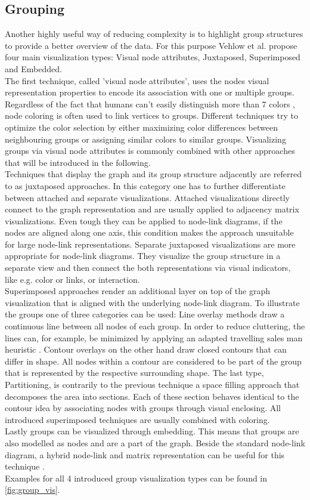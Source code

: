 \subsection{Grouping}
Another highly useful way of reducing complexity is to highlight group structures to provide a better overview of the data. For this purpose Vehlow et al.\cite{Vehlow2015} propose four main visualization types: Visual node attributes, Juxtaposed, Superimposed and Embedded.\\
The first technique, called 'visual node attributes', uses the nodes visual representation properties to encode its association with one or multiple groups. Regardless of the fact that humans can't easily distinguish more than 7 colors \cite{Healey1996}, node coloring is often used to link vertices to groups. Different techniques try to optimize the color selection by either maximizing color differences between neighbouring groups or assigning similar colors to similar groups. Visualizing groups via visual node attributes is commonly combined with other approaches that will be introduced in the following.\\
Techniques that display the graph and its group structure adjacently are referred to as juxtaposed approaches. In this category one has to further differentiate between attached and separate visualizations. Attached visualizations directly connect to the graph representation and are usually applied to adjacency matrix visualizations. Even tough they can be applied to node-link diagrams, if the nodes are aligned along one axis, this condition makes the approach unsuitable for large node-link representations.
Separate juxtaposed visualizations are more appropriate for node-link diagrams. They visualize the group structure in a separate view and then connect the both representations via visual indicators, like e.g. color or links, or interaction.\\
Superimposed approaches render an additional layer on top of the graph visualization that is aligned with the underlying node-link diagram. To illustrate the groups one of three categories can be used: Line overlay methods draw a continuous line between all nodes of each group. In order to reduce cluttering, the lines can, for example, be minimized by applying an adapted travelling sales man heuristic \cite{Alper2011}. Contour overlays on the other hand draw closed contours that can differ in shape. All nodes within a contour are considered to be part of the group that is represented by the respective surrounding shape.
The last type, Partitioning, is contrarily to the previous technique a space filling approach that decomposes the area into sections. Each of these section behaves identical to the contour idea by associating nodes with groups through visual enclosing. All introduced superimposed techniques are usually combined with coloring.\\
Lastly groups can be visualized through embedding. This means that groups are also modelled as nodes and are a part of the graph. Beside the standard node-link diagram, a hybrid node-link and matrix representation can be useful for this technique \cite{Vehlow2015}.\\
Examples for all 4 introduced group visualization types can be found in \autoref{fig:group_vis}. 

